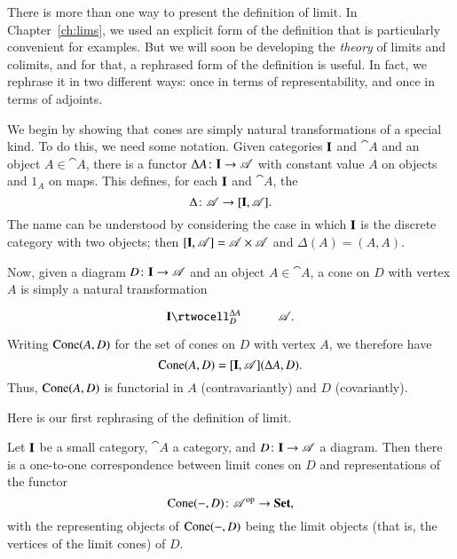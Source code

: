 There is more than one way to present the definition of limit.  In
Chapter~\ref{ch:lims}, we used an explicit form of the definition that is
particularly convenient for examples.  But we will soon be developing the
\emph{theory} of limits and colimits, and for that, a rephrased form of the
definition is useful.  In fact, we rephrase it in two different ways: once
in terms of representability, and once in terms of adjoints.

We begin by showing that cones are simply natural transformations of a
special kind.  To do this, we need some notation.  Given categories
$\mathbf{I}$ and $\cat{A}$ and an object $A \in \cat{A}$, there is a functor
$\Delta A\from \scat{I} \to \cat{A}$ with constant value $A$ on objects and
$1_A$ on maps.  This defines, for each $\mathbf{I}$ and $\cat{A}$, the
\[
\Delta\from \cat{A} \to \ftrcat{\scat{I}}{\cat{A}}.%
%
\ntn{diag-gen}
%
\]
The name can be understood by considering the case in which $\mathbf{I}$ is the
discrete category with two objects; then $[\mathbf{I},\mathscr{A}] = \mathscr{A}
\times \mathscr{A}$ and $\Delta(A) = (A, A)$.

Now, given a diagram $D\from \scat{I} \to \cat{A}$ and an object $A \in
\cat{A}$, a cone on $D$ with vertex $A$ is simply%
%
%
a natural transformation
\[
\xymatrix{
\scat{I} \rtwocell^{\Delta A}_{D} &\cat{A}.
}
\]
Writing $\operatorname{Cone}(A, D)$%
%
%
for the set of cones on $D$ with vertex $A$, we therefore have
% 
\begin{equation}        
\label{eq:cones-as-transfs}
\operatorname{Cone}(A, D)
=
[\mathbf{I},\mathscr{A}] (\Delta A, D).
\end{equation}
% 
Thus, $\operatorname{Cone}(A, D)$ is functorial in $A$ (contravariantly) and $D$
(covariantly).

Here is our first rephrasing of the definition of limit.

\begin{propn}   
\label{propn:lim-rep}
%
%
Let $\mathbf{I}$ be a small category, $\cat{A}$ a category, and $D\from \scat{I}
\to \cat{A}$ a diagram.  Then there is a one-to-one correspondence between
limit cones on $D$ and representations of the functor
\[
\Cone(\dashbk, D) \from \cat{A}^\op \to \Set,
\]
with the representing objects of \hspace{.05em}$\operatorname{Cone}(-, D)$ being the
limit objects (that is, the vertices of the limit cones) of $D$.
\end{propn}

